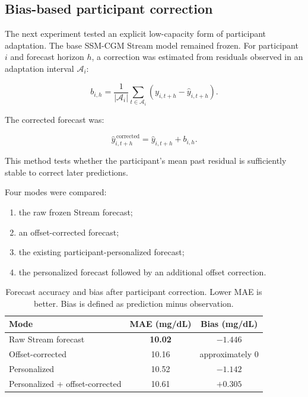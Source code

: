 \subsection{Bias-based participant correction}
\label{subsec:bias_personalization}

The next experiment tested an explicit low-capacity form of participant
adaptation. The base SSM-CGM Stream model remained frozen. For participant
$i$ and forecast horizon $h$, a correction was estimated from residuals
observed in an adaptation interval $\mathcal{A}_i$:

\begin{equation}
b_{i,h}
=
\frac{1}{|\mathcal{A}_i|}
\sum_{t\in\mathcal{A}_i}
\left(
y_{i,t+h}
-
\hat{y}_{i,t+h}
\right).
\end{equation}

The corrected forecast was:

\begin{equation}
\hat{y}^{\,\mathrm{corrected}}_{i,t+h}
=
\hat{y}_{i,t+h}
+
b_{i,h}.
\end{equation}

This method tests whether the participant's mean past residual is sufficiently
stable to correct later predictions.

Four modes were compared:

\begin{enumerate}
    \item the raw frozen Stream forecast;
    \item an offset-corrected forecast;
    \item the existing participant-personalized forecast;
    \item the personalized forecast followed by an additional offset
    correction.
\end{enumerate}

\begin{table}[H]
\centering
\caption{Forecast accuracy and bias after participant correction. Lower MAE is
better. Bias is defined as prediction minus observation.}
\label{tab:personalization_bias}
\begin{tabular}{lcc}
\toprule
Mode & MAE (mg/dL) & Bias (mg/dL) \\
\midrule
Raw Stream forecast & \textbf{10.02} & $-1.446$ \\
Offset-corrected & 10.16 & approximately $0$ \\
Personalized & 10.52 & $-1.142$ \\
Personalized + offset-corrected & 10.61 & $+0.305$ \\
\bottomrule
\end{tabular}
\end{table}

